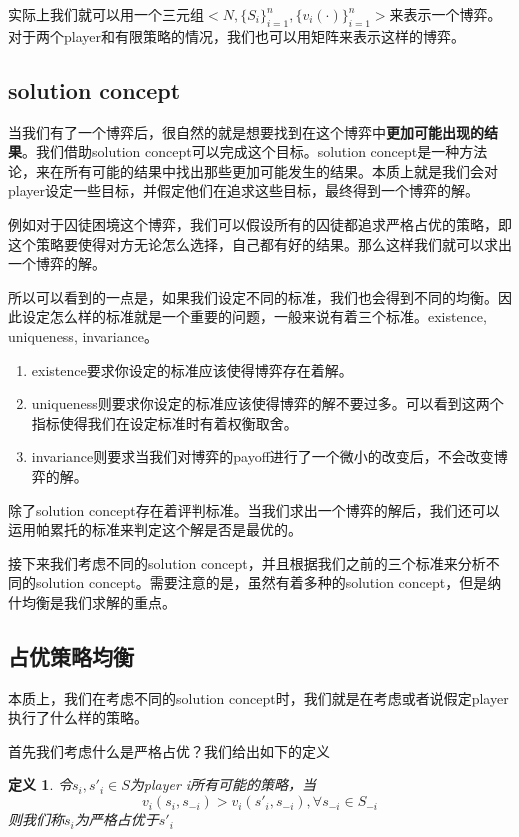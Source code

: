 \documentclass[UTF8,12pt]{ctexart}
\newtheorem{Def}{定义}[section]
\numberwithin{equation}{section} %
\numberwithin{figure}{section}
\numberwithin{table}{section}
\begin{document}
	实际上我们就可以用一个三元组$<N,\{S_i\}_{i=1}^n,\{v_i(\cdot)\}_{i=1}^n>$来表示一个博弈。对于两个player和有限策略的情况，我们也可以用矩阵来表示这样的博弈。
	
	\subsection{solution concept}
	
	当我们有了一个博弈后，很自然的就是想要找到在这个博弈中\textbf{更加可能出现的结果}。我们借助solution concept可以完成这个目标。solution concept是一种方法论，来在所有可能的结果中找出那些更加可能发生的结果。本质上就是我们会对player设定一些目标，并假定他们在追求这些目标，最终得到一个博弈的解。
	
	例如对于囚徒困境这个博弈，我们可以假设所有的囚徒都追求严格占优的策略，即这个策略要使得对方无论怎么选择，自己都有好的结果。那么这样我们就可以求出一个博弈的解。
	
	所以可以看到的一点是，如果我们设定不同的标准，我们也会得到不同的均衡。因此设定怎么样的标准就是一个重要的问题，一般来说有着三个标准。existence, uniqueness, invariance。
	\begin{enumerate}
		\item existence要求你设定的标准应该使得博弈存在着解。
		
		\item uniqueness则要求你设定的标准应该使得博弈的解不要过多。可以看到这两个指标使得我们在设定标准时有着权衡取舍。
		
		\item invariance则要求当我们对博弈的payoff进行了一个微小的改变后，不会改变博弈的解。
	\end{enumerate}
	
	除了solution concept存在着评判标准。当我们求出一个博弈的解后，我们还可以运用帕累托的标准来判定这个解是否是最优的。
	
	接下来我们考虑不同的solution concept，并且根据我们之前的三个标准来分析不同的solution concept。需要注意的是，虽然有着多种的solution concept，但是纳什均衡是我们求解的重点。
	
	\subsection{占优策略均衡}
	本质上，我们在考虑不同的solution concept时，我们就是在考虑或者说假定player执行了什么样的策略。
	
	首先我们考虑什么是严格占优？我们给出如下的定义
	\begin{Def}
		令$s_i,s'_i \in S$为player i所有可能的策略，当
		\begin{equation}
			v_i(s_i,s_{-i}) > v_i(s'_i,s_{-i}),\forall s_{-i} \in S_{-i}
		\end{equation}
		则我们称$s_i$为严格占优于$s'_i$
	\end{Def}
	
\end{document}
